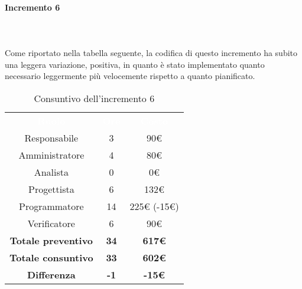 \paragraph*{Incremento 6} \mbox{} \\ \mbox{} \\
Come riportato nella tabella seguente, la codifica di questo incremento ha subito una leggera variazione, positiva, in quanto è stato implementato quanto necessario leggermente più velocemente rispetto a quanto pianificato.
\begin{table}[H]
\centering\renewcommand{\arraystretch}{1.5}
\caption{Consuntivo dell'incremento 6}
\vspace{0.2cm}
\begin{tabular}{ c c c }
\rowcolor{redafk}
\textcolor{white}{\textbf{Ruolo}} & \textcolor{white}{\textbf{Ore}} &
\textcolor{white}{\textbf{Costo}}  \\
Responsabile 	& 3 & 90€ \\
Amministratore 	& 4 & 80€ \\
Analista 		& 0  & 0€ \\
Progettista		& 6  &  132€\\
Programmatore	& 14 & 225€ (-15€) \\
Verificatore 	& 6 & 90€ \\
\textbf{Totale preventivo} & \textbf{34} & \textbf{617€}   \\
\textbf{Totale consuntivo} & \textbf{33} & \textbf{602€}  \\
\rowcolor{lastrowcolor}
\textbf{Differenza} & \textbf{-1} & \textbf{-15€} \\
\end{tabular}
\end{table}

